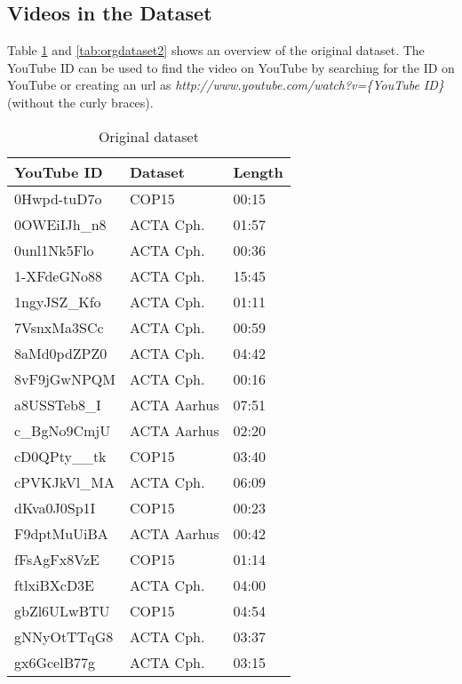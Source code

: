 \subsection{Videos in the Dataset}
%
Table \ref{tab:orgdataset1} and \ref{tab:orgdataset2} shows an overview of the original dataset. The YouTube ID can be used to find the video on YouTube by searching for the ID on YouTube or creating an url as \emph{http://www.youtube.com/watch?v=\{YouTube ID\}} (without the curly braces).
%
\begin{table}[!ht]
	\begin{center}
	\caption{Original dataset}
	\label{tab:orgdataset1}
		\begin{tabular}{lll}
		\toprule
			YouTube ID & Dataset & Length \\
			\midrule
			0Hwpd-tuD7o & COP15 & 00:15 \\
			0OWEiIJh\_n8 & ACTA Cph. & 01:57 \\
			0unl1Nk5Flo & ACTA Cph. & 00:36 \\
			1-XFdeGNo88 & ACTA Cph. & 15:45 \\
			1ngyJSZ\_Kfo & ACTA Cph. & 01:11 \\
			7VsnxMa3SCc & ACTA Cph. & 00:59 \\
			8aMd0pdZPZ0 & ACTA Cph. & 04:42 \\
			8vF9jGwNPQM & ACTA Cph. & 00:16 \\
			a8USSTeb8\_I & ACTA Aarhus & 07:51 \\
			c\_BgNo9CmjU & ACTA Aarhus & 02:20 \\
			cD0QPty\_\_tk & COP15 & 03:40 \\
			cPVKJkVl\_MA & ACTA Cph. & 06:09 \\
			dKva0J0Sp1I & COP15 & 00:23 \\
			F9dptMuUiBA & ACTA Aarhus & 00:42 \\
			fFsAgFx8VzE & COP15 & 01:14 \\
			ftlxiBXcD3E & ACTA Cph. & 04:00 \\
			gbZl6ULwBTU & COP15 & 04:54 \\
			gNNyOtTTqG8 & ACTA Cph. & 03:37 \\
			gx6GcelB77g & ACTA Cph. & 03:15 \\
		\bottomrule
		\end{tabular}
	\end{center}
\end{table}
%
